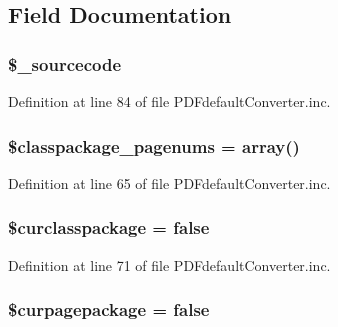 \subsection{\-Field \-Documentation}
\hypertarget{class_p_d_fdefault_converter_ace9657cda2ef03bba6ebe39d2b17822d}{
\subsubsection[{\$\-\_\-sourcecode}]{\setlength{\rightskip}{0pt plus 5cm}\$\-\_\-sourcecode}}\label{class_p_d_fdefault_converter_ace9657cda2ef03bba6ebe39d2b17822d}


\-Definition at line 84 of file \-P\-D\-Fdefault\-Converter.\-inc.

\hypertarget{class_p_d_fdefault_converter_a1848812287db1f25053bd5cb0fa97196}{
\subsubsection[{\$classpackage\-\_\-pagenums}]{\setlength{\rightskip}{0pt plus 5cm}\$classpackage\-\_\-pagenums = array()}}\label{class_p_d_fdefault_converter_a1848812287db1f25053bd5cb0fa97196}


\-Definition at line 65 of file \-P\-D\-Fdefault\-Converter.\-inc.

\hypertarget{class_p_d_fdefault_converter_a10d524694477913d45be2528a61bfa0a}{
\subsubsection[{\$curclasspackage}]{\setlength{\rightskip}{0pt plus 5cm}\$curclasspackage = false}}\label{class_p_d_fdefault_converter_a10d524694477913d45be2528a61bfa0a}


\-Definition at line 71 of file \-P\-D\-Fdefault\-Converter.\-inc.

\hypertarget{class_p_d_fdefault_converter_ab9341729416d2d0888fcefacea4d1a44}{
\subsubsection[{\$curpagepackage}]{\setlength{\rightskip}{0pt plus 5cm}\$curpagepackage = false}}\label{class_p_d_fdefault_converter_ab9341729416d2d0888fcefacea4d1a44}


